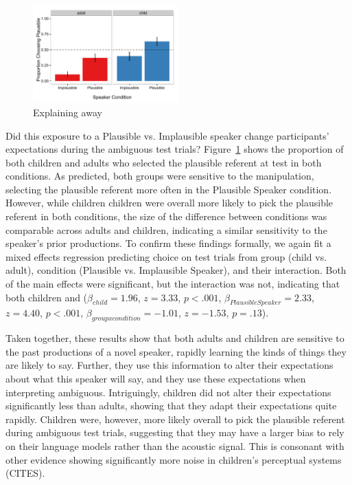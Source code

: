 \documentclass[man,floatsintext]{apa6}
\begin{document}
\begin{figure}[t]
     \begin{center}
     \includegraphics[width=0.5\textwidth]{figures/exp1_results.pdf}
    \end{center}
    \caption{Explaining away}%
   \label{fig:exp1_results}
\end{figure}


Did this exposure to a Plausible vs. Implausible speaker change participants' expectations during the ambiguous test trials? Figure~\ref{fig:exp1_results} shows the proportion of both children and adults who selected the plausible referent at test in both conditions. As predicted, both groups were sensitive to the manipulation, selecting the plausible referent more often in the Plausible Speaker condition. However, while children children were overall more likely to pick the plausible referent in both conditions, the size of the difference between conditions was comparable across adults and children, indicating a similar sensitivity to the speaker's prior productions. To confirm these findings formally, we again fit a mixed effects regression predicting choice on test trials from group (child vs. adult), condition (Plausible vs. Implausible Speaker), and their interaction. Both of the main effects were significant, but the interaction was not, indicating that both children and  ($\beta_{child} = 1.96$,  $z = 3.33$, $p <.001$, $\beta_{Plausible Speaker} = 2.33$,  $z = 4.40$, $p <.001$,  $\beta_{group x condition} = -1.01$,  $z = -1.53$, $p = .13$).

Taken together, these results show that both adults and children are sensitive to the past productions of a novel speaker, rapidly learning the kinds of things they are likely to say. Further, they use this information to alter their expectations about what this speaker will say, and they use these expectations when interpreting ambiguous. Intriguingly, children did not alter their expectations significantly less than adults, showing that they adapt their expectations quite rapidly. Children were, however, more likely overall to pick the plausible referent during ambiguous test trials, suggesting that they may have a larger bias to rely on their language models rather than the acoustic signal. This is consonant with other evidence showing significantly more noise in children's perceptual systems (CITES).
\end{document}
